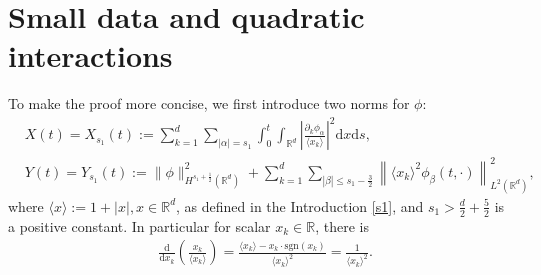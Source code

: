 \documentclass[10pt,twoside,a4paper]{article}
\numberwithin{equation}{section}\allowdisplaybreaks
\def\leq{\leqslant}
\begin{document}
\section{Small data and	quadratic interactions}  \label{s3}
To make the proof more concise,  we first introduce two norms  for $\phi $:
\begin{align*}
	&X(t)=X_{s_1} (t) :=\sum_{k=1}^d \sum_{|\alpha|= s_1}  \int_0^t     \int_{\mathbb{R}^{d}} \left|\frac{\partial_k \phi_{\alpha }  } {\langle x_k\rangle}\right|^2  \mathrm{d} x \mathrm{d} s,  \nonumber\\
	&Y(t)=Y_{s_1} (t) :=	\| \phi\|_{H^{ s_1+\frac12 }(\mathbb{R}^d)}^2 + \sum_{k=1}^d\sum_{|\beta| \leq s_1-\frac32}\left\| \langle x_k\rangle^2 \phi_{\beta}\left(t,\cdot\right)\right\|_{L^2(\mathbb{R}^d)}^2,
\end{align*}	
where $ \langle x \rangle:=  1+|x| , x\in \mathbb{R}^d $, as defined in the Introduction \ref{s1}, and $ s_1 >\frac d2+\frac 52$ is a positive constant. In particular for scalar $ x_k\in \mathbb{R} $, there is 
\begin{align*}
	&\frac{\mathrm{d}}{ \mathrm{d} x_k}\left( \frac{x_k}{\langle x_k \rangle}\right)=\frac{\langle x_k \rangle-x_k\cdot \mathrm{sgn}\left(x_k\right)}{\langle x_k \rangle^2}=\frac{1}{\langle x_k \rangle^2}.
\end{align*}
\end{document}
